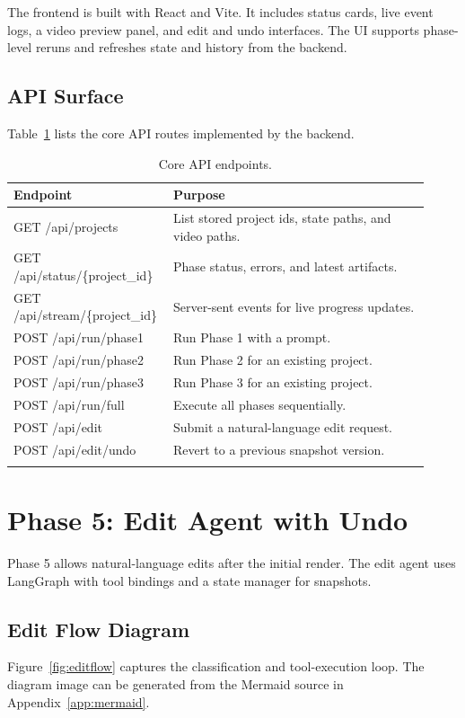 \documentclass[11pt]{article}
\begin{document}
The frontend is built with React and Vite. It includes status cards, live event logs, a video preview panel, and edit and undo interfaces. The UI supports phase-level reruns and refreshes state and history from the backend.

\subsection{API Surface}
Table~\ref{tab:api} lists the core API routes implemented by the backend.

\begin{longtable}{|p{0.32\linewidth}|p{0.60\linewidth}|}
\hline
\textbf{Endpoint} & \textbf{Purpose} \\
\hline
GET /api/projects & List stored project ids, state paths, and video paths. \\
GET /api/status/\{project\_id\} & Phase status, errors, and latest artifacts. \\
GET /api/stream/\{project\_id\} & Server-sent events for live progress updates. \\
POST /api/run/phase1 & Run Phase 1 with a prompt. \\
POST /api/run/phase2 & Run Phase 2 for an existing project. \\
POST /api/run/phase3 & Run Phase 3 for an existing project. \\
POST /api/run/full & Execute all phases sequentially. \\
POST /api/edit & Submit a natural-language edit request. \\
POST /api/edit/undo & Revert to a previous snapshot version. \\
\hline
\caption{Core API endpoints.}
\label{tab:api}
\end{longtable}

\section{Phase 5: Edit Agent with Undo}
Phase 5 allows natural-language edits after the initial render. The edit agent uses LangGraph with tool bindings and a state manager for snapshots.

\subsection{Edit Flow Diagram}
Figure~\ref{fig:editflow} captures the classification and tool-execution loop. The diagram image can be generated from the Mermaid source in Appendix~\ref{app:mermaid}.
\end{document}
